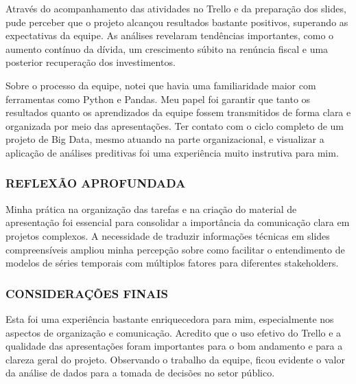\documentclass{article}
\begin{document}
Através do acompanhamento das atividades no Trello e da preparação dos slides, pude perceber que o projeto alcançou resultados bastante positivos, superando as expectativas da equipe. As análises revelaram tendências importantes, como o aumento contínuo da dívida, um crescimento súbito na renúncia fiscal e uma posterior recuperação dos investimentos.

Sobre o processo da equipe, notei que havia uma familiaridade maior com ferramentas como Python e Pandas. Meu papel foi garantir que tanto os resultados quanto os aprendizados da equipe fossem transmitidos de forma clara e organizada por meio das apresentações. Ter contato com o ciclo completo de um projeto de Big Data, mesmo atuando na parte organizacional, e visualizar a aplicação de análises preditivas foi uma experiência muito instrutiva para mim.

\subsubsection{REFLEXÃO APROFUNDADA}

Minha prática na organização das tarefas e na criação do material de apresentação foi essencial para consolidar a importância da comunicação clara em projetos complexos. A necessidade de traduzir informações técnicas em slides compreensíveis ampliou minha percepção sobre como facilitar o entendimento de modelos de séries temporais com múltiplos fatores para diferentes stakeholders.

\subsubsection{CONSIDERAÇÕES FINAIS}

Esta foi uma experiência bastante enriquecedora para mim, especialmente nos aspectos de organização e comunicação. Acredito que o uso efetivo do Trello e a qualidade das apresentações foram importantes para o bom andamento e para a clareza geral do projeto. Observando o trabalho da equipe, ficou evidente o valor da análise de dados para a tomada de decisões no setor público.



\end{document}
